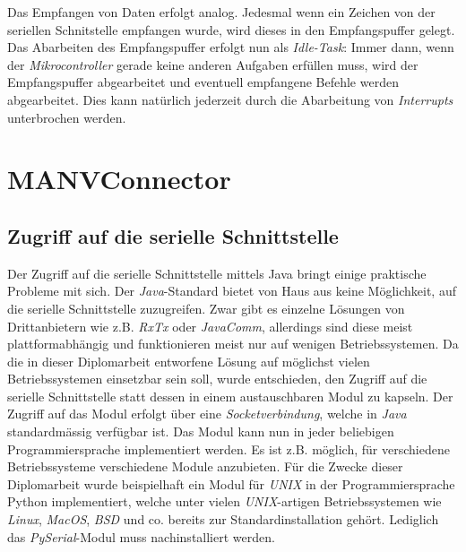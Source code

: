 Das Empfangen von Daten erfolgt analog. Jedesmal wenn ein Zeichen von der seriellen Schnitstelle empfangen
wurde, wird dieses in den Empfangspuffer gelegt. Das Abarbeiten des Empfangspuffer erfolgt nun als \emph{Idle-Task}:
Immer dann, wenn der \emph{Mikrocontroller} gerade keine anderen Aufgaben erfüllen muss, wird der Empfangspuffer
abgearbeitet und eventuell empfangene Befehle werden abgearbeitet. Dies kann natürlich jederzeit durch 
die Abarbeitung von \emph{Interrupts} unterbrochen werden.

\section{MANVConnector}
\subsection{Zugriff auf die serielle Schnittstelle}
Der Zugriff auf die serielle Schnittstelle mittels Java bringt einige praktische Probleme mit sich.
Der \emph{Java}-Standard bietet von Haus aus keine Möglichkeit, auf die serielle Schnittstelle zuzugreifen.
Zwar gibt es einzelne Lösungen von Drittanbietern wie z.B. \emph{RxTx} oder \emph{JavaComm}, allerdings
sind diese meist plattformabhängig und funktionieren meist nur auf wenigen Betriebssystemen. Da die
in dieser Diplomarbeit entworfene Lösung auf möglichst vielen Betriebssystemen einsetzbar sein soll, 
wurde entschieden, den Zugriff auf die serielle Schnittstelle statt dessen in einem austauschbaren
Modul zu kapseln. Der Zugriff auf das Modul erfolgt über eine \emph{Socketverbindung}, welche in \emph{Java}
standardmässig verfügbar ist. Das Modul kann nun in jeder beliebigen Programmiersprache implementiert
werden. Es ist z.B. möglich, für verschiedene Betriebssysteme verschiedene Module anzubieten.
Für die Zwecke dieser Diplomarbeit wurde beispielhaft ein Modul für \emph{UNIX} in der Programmiersprache
Python implementiert, welche unter vielen \emph{UNIX}-artigen Betriebssystemen wie \emph{Linux}, \emph{MacOS}, 
\emph{BSD} und co.  bereits zur Standardinstallation gehört. Lediglich das \emph{PySerial}-Modul muss nachinstalliert werden.

